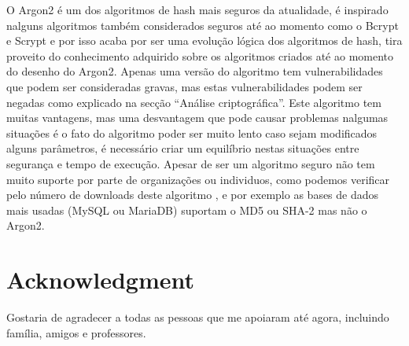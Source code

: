 \documentclass[conference]{IEEEtran}
\begin{document}
O Argon2 é um dos algoritmos de hash mais seguros da atualidade, é inspirado nalguns 
algoritmos também considerados seguros até ao momento como o Bcrypt e Scrypt e por isso 
acaba por ser uma evolução lógica dos algoritmos de hash, tira proveito do conhecimento 
adquirido sobre os algoritmos criados até ao momento do desenho do Argon2. Apenas uma versão do algoritmo tem 
vulnerabilidades que podem ser consideradas gravas, mas estas vulnerabilidades podem ser 
negadas como explicado na secção “Análise criptográfica”. Este algoritmo tem muitas 
vantagens, mas uma desvantagem que pode causar problemas nalgumas situações é o fato do 
algoritmo poder ser muito lento caso sejam modificados alguns parâmetros, é necessário 
criar um equilíbrio nestas situações entre segurança e tempo de execução. Apesar de ser 
um algoritmo seguro não tem muito suporte por parte de organizações ou individuos, como podemos
verificar pelo número de downloads deste algoritmo \cite{hashtrends}, e por exemplo as bases 
de dados mais usadas (MySQL ou MariaDB) suportam o MD5 ou SHA-2 mas não o Argon2.

\section*{Acknowledgment}

Gostaria de agradecer a todas as pessoas que me apoiaram até agora, incluindo
família, amigos e professores.



\end{document}
